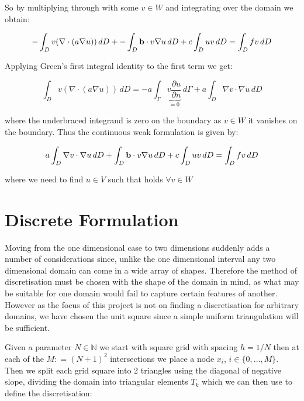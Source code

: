 So by multiplying through with some $v \in W$ and integrating over the domain
we obtain:

\begin{equation}
    -\int_{D}{v(\nabla\cdot(a\nabla{u}))}\,dD +
    -\int_{D}\mathbf{b}\cdot v\nabla{u}\,dD +
    c\int_{D}uv\,dD = \int_{D}fv\,dD
\end{equation}

Applying Green's first integral identity to the first term we get:

\begin{equation}
    \int_{D}v(\nabla\cdot(a\nabla u))\, dD =
    -a\int_{\Gamma}\underbrace{v\frac{\partial{u}}{\partial{n}}}_{ =0} \,d\Gamma
    + a\int_{D}\nabla{v}\cdot\nabla{u}\,dD
\end{equation}

where the underbraced integrand is zero on the boundary as $v \in W$ it
vanishes on the boundary. Thus the continuous weak formulation is given by:

\begin{equation}\label{eq:wk-twod-deterministic}
    a\int_{D}\nabla{v}\cdot\nabla{u}\,dD +
    \int_{D}\mathbf{b}\cdot v\nabla{u}\,dD + c\int_{D}uv\,dD =
    \int_{D}fv\,dD
\end{equation}

where we need to find $u \in V$ such that 
holds $\forall v \in W$

\section{Discrete Formulation}

Moving from the one dimensional case to two dimensions suddenly adds a number
of considerations since, unlike the one dimensional interval any two
dimensional domain can come in a wide array of shapes. Therefore the method of
discretisation must be chosen with the shape of the domain in mind, as what may
be suitable for one domain would fail to capture certain features of
another. However as the focus of this project is not on finding a discretisation
for arbitrary domains, we have chosen the unit square since a simple uniform
triangulation will be sufficient.

Given a parameter $N \in \mathbb{N}$ we start with square grid with spacing $h
= 1/N$ then at each of the $M: = (N+1)^2$ intersections we place a node $x_i$,
$i \in \{0,\ldots,M\}$. Then we split each grid square into 2 triangles
using the diagonal of negative slope, dividing the domain into triangular
elements $T_k$ which we can then use to define the discretisation:

